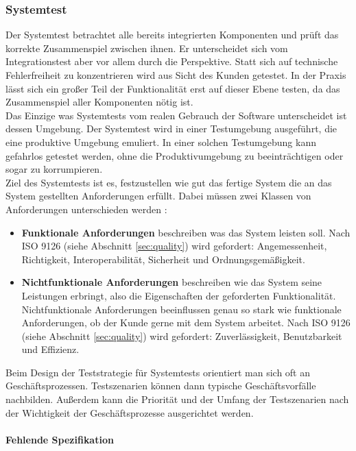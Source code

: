 \subsubsection{Systemtest}
Der Systemtest betrachtet alle bereits integrierten Komponenten und prüft das korrekte Zusammenspiel zwischen ihnen. Er unterscheidet sich vom Integrationstest aber vor allem durch die Perspektive. Statt sich auf technische Fehlerfreiheit zu konzentrieren wird aus Sicht des Kunden getestet. In der Praxis lässt sich ein großer Teil der Funktionalität erst auf dieser Ebene testen, da das Zusammenspiel aller Komponenten nötig ist.\\
Das Einzige was Systemtests vom realen Gebrauch der Software unterscheidet ist dessen Umgebung. Der Systemtest wird in einer Testumgebung ausgeführt, die eine produktive Umgebung emuliert. In einer solchen Testumgebung kann gefahrlos getestet werden, ohne die Produktivumgebung zu beeinträchtigen oder sogar zu korrumpieren.\\
Ziel des Systemtests ist es, festzustellen wie gut das fertige System die an das System gestellten Anforderungen erfüllt. Dabei müssen zwei Klassen von Anforderungen unterschieden werden \cite{spillner_basiswissen_2012}:

\begin{itemize}
\item \textbf{Funktionale Anforderungen} beschreiben was das System leisten soll. Nach ISO 9126 (siehe Abschnitt \ref{sec:quality}) wird gefordert: Angemessenheit, Richtigkeit, Interoperabilität, Sicherheit und Ordnungsgemäßigkeit.
\item \textbf{Nichtfunktionale Anforderungen} beschreiben wie das System seine Leistungen erbringt, also die Eigenschaften der geforderten Funktionalität. Nichtfunktionale Anforderungen beeinflussen genau so stark wie funktionale Anforderungen, ob der Kunde gerne mit dem System arbeitet. Nach ISO 9126 (siehe Abschnitt \ref{sec:quality}) wird gefordert: Zuverlässigkeit, Benutzbarkeit und Effizienz.
\end{itemize}

Beim Design der Teststrategie für Systemtests orientiert man sich oft an Geschäftsprozessen. Testszenarien können dann typische Geschäftsvorfälle nachbilden. Außerdem kann die Priorität und  der Umfang der Testszenarien nach der Wichtigkeit der Geschäftsprozesse ausgerichtet werden.

\paragraph{Fehlende Spezifikation}

